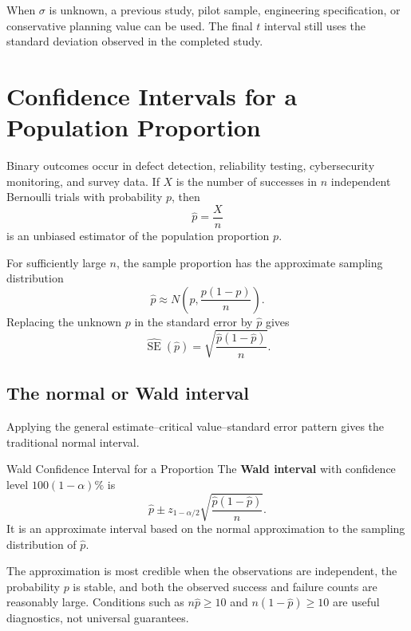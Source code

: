 When $\sigma$ is unknown, a previous study, pilot sample, engineering specification, or conservative planning value can be used. The final $t$ interval still uses the standard deviation observed in the completed study.

\section{Confidence Intervals for a Population Proportion}
\label{sec:confidence-interval-proportion}

Binary outcomes occur in defect detection, reliability testing, cybersecurity monitoring, and survey data. If $X$ is the number of successes in $n$ independent Bernoulli trials with probability $p$, then
\[
    \widehat p=\frac{X}{n}
\]
is an unbiased estimator of the population proportion $p$.

For sufficiently large $n$, the sample proportion has the approximate sampling distribution
\[
    \widehat p
      \approx
      N\!\left(p,\frac{p(1-p)}{n}\right).
\]
Replacing the unknown $p$ in the standard error by $\widehat p$ gives
\[
    \widehat{\operatorname{SE}}(\widehat p)
      =\sqrt{\frac{\widehat p(1-\widehat p)}{n}}.
\]

\subsection{The normal or Wald interval}

Applying the general estimate--critical value--standard error pattern gives the traditional normal interval.

\begin{definition}{Wald Confidence Interval for a Proportion}
The \textbf{Wald interval} with confidence level $100(1-\alpha)\%$ is
\[
    \widehat p
      \pm
      z_{1-\alpha/2}
      \sqrt{\frac{\widehat p(1-\widehat p)}{n}}.
\]
It is an approximate interval based on the normal approximation to the sampling distribution of $\widehat p$.
\end{definition}

The approximation is most credible when the observations are independent, the probability $p$ is stable, and both the observed success and failure counts are reasonably large. Conditions such as $n\widehat p\geq10$ and $n(1-\widehat p)\geq10$ are useful diagnostics, not universal guarantees.

\newpage

